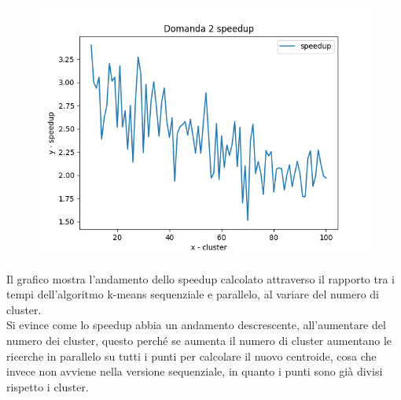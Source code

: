 \documentclass{article}
\begin{document}
\begin{center}
	\begin{figure}[H]
		\includegraphics[width=1\linewidth, valign=t]{figures/domanda2speedup}
	\end{figure}
\end{center}
Il grafico mostra l'andamento dello speedup calcolato attraverso il rapporto tra i tempi dell'algoritmo k-means sequenziale e parallelo, al variare del numero di cluster. \\
Si evince come lo speedup abbia un andamento descrescente, all'aumentare del numero dei cluster, questo perché se aumenta il numero di cluster aumentano le ricerche in parallelo su tutti i punti per calcolare il nuovo centroide, cosa che invece non avviene nella versione sequenziale, in quanto i punti sono già divisi rispetto i cluster.
\end{document}
